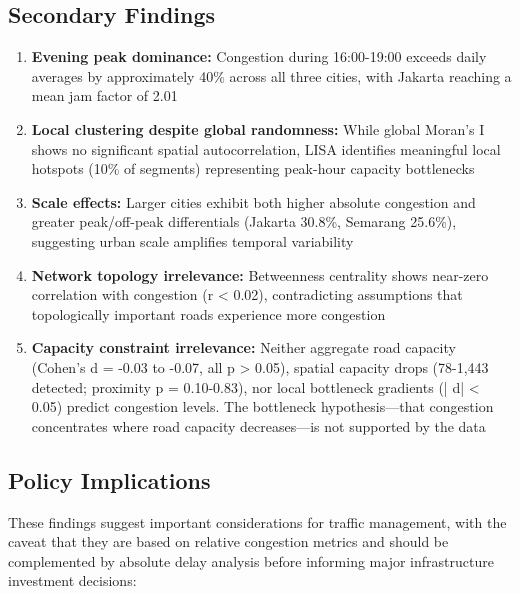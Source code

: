 \documentclass[12pt,a4paper]{article}
\begin{document}
\subsection{Secondary Findings}

\begin{enumerate}
\def\labelenumi{\arabic{enumi}.}
\item
  \textbf{Evening peak dominance:} Congestion during 16:00-19:00 exceeds daily averages by approximately 40\% across all three cities, with Jakarta reaching a mean jam factor of 2.01
\item
  \textbf{Local clustering despite global randomness:} While global Moran's I shows no significant spatial autocorrelation, LISA identifies meaningful local hotspots (10\% of segments) representing peak-hour capacity bottlenecks
\item
  \textbf{Scale effects:} Larger cities exhibit both higher absolute congestion and greater peak/off-peak differentials (Jakarta 30.8\%, Semarang 25.6\%), suggesting urban scale amplifies temporal variability
\item
  \textbf{Network topology irrelevance:} Betweenness centrality shows near-zero correlation with congestion (r < 0.02), contradicting assumptions that topologically important roads experience more congestion
\item
  \textbf{Capacity constraint irrelevance:} Neither aggregate road capacity (Cohen's d = -0.03 to -0.07, all p > 0.05), spatial capacity drops (78-1,443 detected; proximity p = 0.10-0.83), nor local bottleneck gradients (| d| < 0.05) predict congestion levels. The bottleneck hypothesis---that congestion concentrates where road capacity decreases---is not supported by the data
\end{enumerate}

\subsection{Policy Implications}

These findings suggest important considerations for traffic management, with the caveat that they are based on relative congestion metrics and should be complemented by absolute delay analysis before informing major infrastructure investment decisions:
\end{document}
